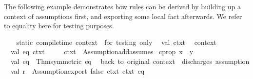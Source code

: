 \begin{isabellebody}
\begin{isamarkuptext}
\begin{description}
  \end{description}%
\end{isamarkuptext}%
\isamarkuptrue%
%
\endisatagmlref
{\isafoldmlref}%
%
\isadelimmlref
%
\endisadelimmlref
%
\isadelimmlex
%
\endisadelimmlex
%
\isatagmlex
%
\begin{isamarkuptext}%
The following example demonstrates how rules can be
  derived by building up a context of assumptions first, and exporting
  some local fact afterwards.  We refer to  equality
  here for testing purposes.%
\end{isamarkuptext}%
\isamarkuptrue%
%
\endisatagmlex
{\isafoldmlex}%
%
\isadelimmlex
%
\endisadelimmlex
%
\isadelimML
%
\endisadelimML
%
\isatagML
{}\isamarkupfalse%
\ {}\isanewline
\ \ {}{}static\ compile{}time\ context\ {}{}\ for\ testing\ only{}{}\isanewline
\ \ val\ ctxt{}\ {}\ %
\isaantiq
context{}%
\endisaantiq
{}\isanewline
\isanewline
\ \ val\ {}{}eq{}{}\ ctxt{}{}\ {}\isanewline
\ \ \ \ ctxt{}\ {}{}\ Assumption{}add{}assumes\ {}%
\isaantiq
cprop\ {}x\ {}\ y{}{}%
\endisaantiq
{}{}\isanewline
\ \ val\ eq{}\ {}\ Thm{}symmetric\ eq{}\isanewline
\isanewline
\ \ {}{}back\ to\ original\ context\ {}{}\ discharges\ assumption{}{}\isanewline
\ \ val\ r\ {}\ Assumption{}export\ false\ ctxt{}\ ctxt{}\ eq{}{}\isanewline

\end{isabellebody}
